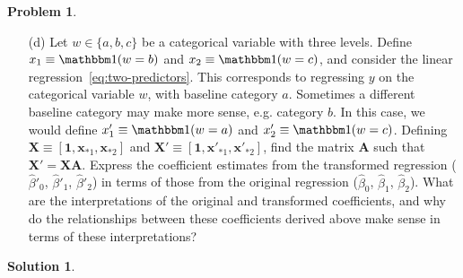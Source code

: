 \documentclass[11pt,letterpaper,english,oneside]{article} %
\theoremstyle{definition} %
\newtheorem{problem}{Problem}
\newtheorem{solution}{Solution}
\newenvironment{prob}{\clearpage \begin{problem}\hspace{0pt}}{\end{problem}}
\newenvironment{sol}{\begin{solution}\hspace{0pt}}{\end{solution}}
\begin{document}
\begin{prob}
\begin{enumerate}
\item[(d)] Let $w \in \{a,b,c\}$ be a categorical variable with three levels. Define $x_1 \equiv \mathbbm 1(w = b)$ and $x_2 \equiv \mathbbm 1(w = c)$, and consider the linear regression~\eqref{eq:two-predictors}. This corresponds to regressing $y$ on the categorical variable $w$, with baseline category $a$. Sometimes a different baseline category may make more sense, e.g. category $b$. In this case, we would define $x'_1 \equiv \mathbbm 1(w = a)$ and $x'_2 \equiv \mathbbm 1(w = c)$. Defining $\bm X \equiv [\bm 1, \bm x_{*1}, \bm x_{*2}]$ and $\bm X' \equiv [\bm 1, \bm x'_{*1}, \bm x'_{*2}]$, find the matrix $\bm A$ such that $\bm X' = \bm X \bm A$. Express the coefficient estimates from the transformed regression ($\widehat \beta'_0$, $\widehat \beta'_1$, $\widehat \beta'_2$) in terms of those from the original regression ($\widehat \beta_0$, $\widehat \beta_1$, $\widehat \beta_2$). What are the interpretations of the original and transformed coefficients, and why do the relationships between these coefficients derived above make sense in terms of these interpretations? 

\end{enumerate}

\end{prob}

\begin{sol}
\end{sol}
\end{document}
